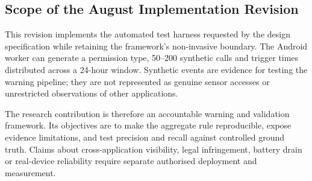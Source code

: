 
\subsection{Scope of the August Implementation Revision}

This revision implements the automated test harness requested by the design specification while retaining the framework's non-invasive boundary. The Android worker can generate a permission type, 50--200 synthetic calls and trigger times distributed across a 24-hour window. Synthetic events are evidence for testing the warning pipeline; they are not represented as genuine sensor accesses or unrestricted observations of other applications.

The research contribution is therefore an accountable warning and validation framework. Its objectives are to make the aggregate rule reproducible, expose evidence limitations, and test precision and recall against controlled ground truth. Claims about cross-application visibility, legal infringement, battery drain or real-device reliability require separate authorised deployment and measurement.

